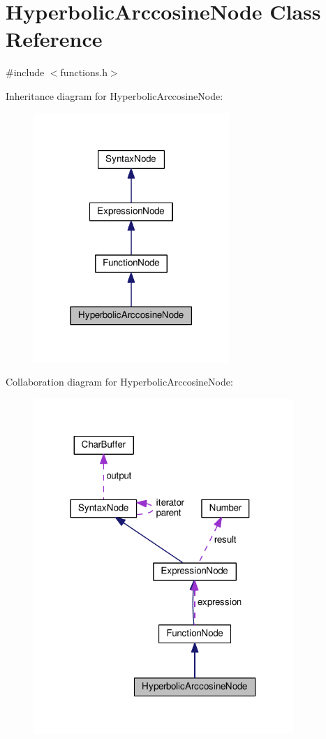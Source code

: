 \hypertarget{classHyperbolicArccosineNode}{}\section{Hyperbolic\+Arccosine\+Node Class Reference}
\label{classHyperbolicArccosineNode}


{\ttfamily \#include $<$functions.\+h$>$}



Inheritance diagram for Hyperbolic\+Arccosine\+Node\+:\nopagebreak
\begin{figure}[H]
\begin{center}
\leavevmode
\includegraphics[width=210pt]{classHyperbolicArccosineNode__inherit__graph}
\end{center}
\end{figure}


Collaboration diagram for Hyperbolic\+Arccosine\+Node\+:\nopagebreak
\begin{figure}[H]
\begin{center}
\leavevmode
\includegraphics[width=279pt]{classHyperbolicArccosineNode__coll__graph}
\end{center}
\end{figure}

